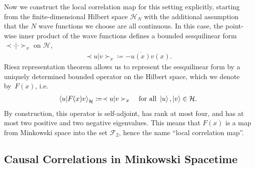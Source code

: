 \documentclass[reqno,11pt]{amsart}
\newcommand{\defeq}{\coloneqq}
\newcommand{\diracad}[1]{\overline{#1}}
\newcommand{\spinbraket}[2]{\prec #1 | #2 \succ}
\renewcommand{\H}{\mathcal{H}}
\newcommand{\F}{{\mathcal{F}}}
\numberwithin{equation}{section}
\begin{document}
Now we construct the local correlation map for this setting explicitly, starting from the finite-dimensional Hilbert
space $\H_N$ with the additional assumption that the $N$ wave functions we choose are all continuous.
In this case, the point-wise inner product of the wave
functions defines a bounded sesquilinear form~$\spinbraket{\cdot}{\cdot}_x$ on $\H$,
\begin{align*}
    \spinbraket{u}{v}_x \defeq - \diracad{u(x)} v(x).
\end{align*}
Riesz representation theorem allows us to represent the sesquilinear form by a uniquely determined bounded operator on
the Hilbert space, which we denote by~$F(x)$, i.e.
\begin{align*}
    \braket{u}{F(x) v}_\H \defeq \spinbraket{u}{v}_x && \text{ for all } \ket{u}, \ket{v} \in \H.
\end{align*}
By construction, this operator is self-adjoint, has rank at most four, and has
at most two positive and two negative eigenvalues.
This means that $F(x)$ is a map from Minkowski space into the set $\F_2$, hence the name ``local correlation map''.

% 
\subsection{Causal Correlations in Minkowski Spacetime}\label{subsec:causal-correlations-in-the-continuum}
\end{document}
